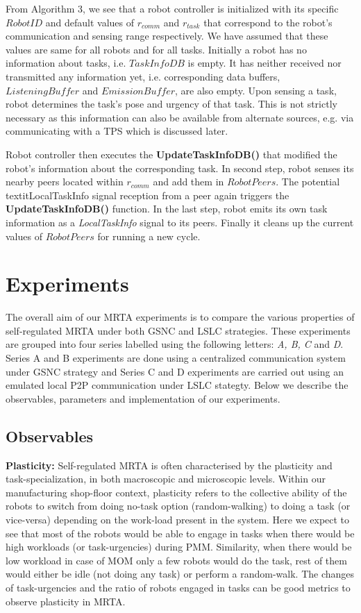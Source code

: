 \documentclass[final,5p,times,twocolumn]{elsarticle}
\begin{document}
From Algorithm 3, we see that a robot controller is initialized with its specific $RobotID$ and default values of $r_{comm}$ and $r_{task}$ that correspond to the robot's communication and sensing range respectively. We have assumed that these values are same for all robots and for all tasks. Initially a robot has no information about tasks, i.e. {$TaskInfoDB$} is empty. It has neither received nor transmitted any information yet, i.e. corresponding data buffers, $ListeningBuffer$ and $EmissionBuffer$, are also empty. Upon sensing a task, robot determines the task's pose and urgency of that task. This is not strictly necessary as this information can also be available from alternate sources, e.g. via communicating with a TPS which is discussed later.

Robot controller then executes the \textbf{UpdateTaskInfoDB()} that modified the robot's information about the corresponding task. In second step, robot senses its nearby peers located within $r_{comm}$ and add them in $RobotPeers$. The potential textit{LocalTaskInfo} signal reception from a  peer again triggers the \textbf{UpdateTaskInfoDB()} function. In the last step, robot emits its own task information as a \textit{LocalTaskInfo} signal to its peers. Finally it cleans up the current values of $RobotPeers$ for running a new cycle.
\section{Experiments}
\label{sec:expt}
The overall aim of our MRTA experiments is to compare the various properties of self-regulated MRTA under both GSNC and LSLC strategies. These experiments are grouped into four series labelled using the following letters: \textit{A, B, C} and \textit{D}. Series A and B experiments are done using a centralized communication system under GSNC strategy and Series C and D experiments are carried out using an emulated local P2P communication under LSLC stategty. Below we describe the observables, parameters and implementation of our experiments.
\subsection{Observables}
\textbf{Plasticity:} %
Self-regulated MRTA is often characterised by the plasticity and task-specialization, in both macroscopic and microscopic levels. Within our manufacturing shop-floor context, plasticity refers to the collective ability of the robots to switch from doing no-task option (random-walking) to doing a task (or vice-versa) depending on the work-load present in the system. Here we expect to see that most of the robots would be able to engage in tasks when there would be high workloads (or task-urgencies) during PMM. Similarity, when there would be low workload in case of MOM only a few robots would do the task, rest of them would either be idle (not doing any task) or perform a random-walk.  The changes of task-urgencies and the ratio of robots engaged in tasks can be good metrics to observe plasticity in MRTA.
\end{document}
